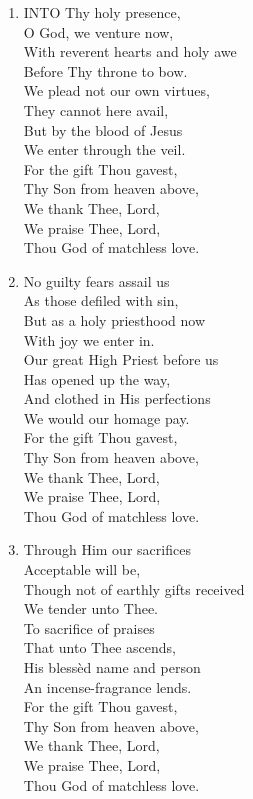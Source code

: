 \documentclass[11pt,a4paper]{article}
\begin{document}
\begin{enumerate}
    \item INTO Thy holy presence, \\
        O God, we venture now, \\
        With reverent hearts and holy awe \\
        Before Thy throne to bow. \\
        We plead not our own virtues, \\
        They cannot here avail, \\
        But by the blood of Jesus \\
        We enter through the veil. \\
        For the gift Thou gavest, \\
        Thy Son from heaven above, \\
        We thank Thee, Lord, \\
        We praise Thee, Lord, \\
        Thou God of matchless love.

    \item No guilty fears assail us \\
        As those defiled with sin, \\
        But as a holy priesthood now \\
        With joy we enter in. \\
        Our great High Priest before us \\
        Has opened up the way, \\
        And clothed in His perfections \\
        We would our homage pay. \\
        For the gift Thou gavest, \\
        Thy Son from heaven above, \\
        We thank Thee, Lord, \\
        We praise Thee, Lord, \\
        Thou God of matchless love.

    \item Through Him our sacrifices \\
        Acceptable will be, \\
        Though not of earthly gifts received \\
        We tender unto Thee. \\
        To sacrifice of praises \\
        That unto Thee ascends, \\
        His bless\`ed name and person \\
        An incense-fragrance lends. \\
        For the gift Thou gavest, \\
        Thy Son from heaven above, \\
        We thank Thee, Lord, \\
        We praise Thee, Lord, \\
        Thou God of matchless love.


\end{enumerate}
\end{document}
